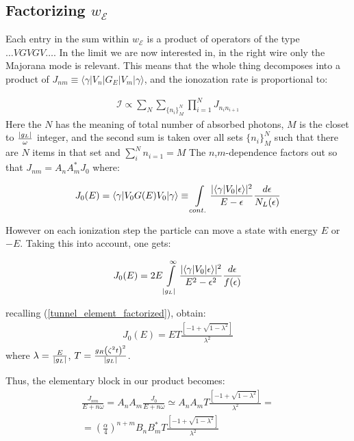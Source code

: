 \subsection{Factorizing $ w_\mathcal{E} $}
Each entry in the sum within $ w_{\mathcal{E}} $ is a product of operators of the type $ \dots VGVGV\dots. $ In the limit we are now interested in, in the right wire only the Majorana mode is relevant. This means that the whole thing decomposes into a product of $ J_{nm}\equiv\langle\gamma|V_{n}|G_{E}|V_{m}|\gamma\rangle $, and the ionozation rate is proportional to:

\begin{gather}
	\mathcal{I}\propto
	\sum_N \sum_{\{n_i\}_M^N}\prod_{i=1}^{N}J_{n_in_{i+1}}
\end{gather}
Here the $ N $ has the meaning of total number of absorbed photons, $ M $ is the closet to $ \frac{\left|g_L\right|}{\omega }$ integer, and the second sum is taken over all sets $ \{n_i\}_M^N $ such that there are $ N $ items in that set and $ \sum_i^N n_{i=1} = M$
 The $ n $,$ m $-dependence factors out so that $ J_{nm}=A_{n}A_{m}^{*}J_{0} $ where:

\begin{gather}
	J_{0}(E)=\langle\gamma|V_{0}G(E)V_{0}|\gamma\rangle\equiv\intop_{cont.}\frac{|\langle\gamma|V_{0}|\epsilon\rangle|^{2}}{E-\epsilon}\frac{d\epsilon}{N_L(\epsilon)}
\end{gather}

However on each ionization step  the particle can move a state with energy $ E $ or $ -E $. Taking this into account, one	 gets:

\begin{gather}
	J_{0}(E)
	=
	2E\intop_{|g_{L}|}^{\infty}\frac{|\langle\gamma|V_{0}|\epsilon\rangle|^{2}}{E^{2}-\epsilon^{2}}\frac{d\epsilon}{f(\epsilon)}
\end{gather}

recalling (\ref{tunnel_element_factorized}), obtain:
\begin{gather}
		J_{0}(E)
		=
		ET\frac{\left[-1+\sqrt{1-\lambda^{2}}\right]}{\lambda^{2}}
\end{gather}
where $ \lambda = \frac{E}{\left|g_L\right|} $, $ T=\frac{g_R\left(\zeta^2t\right)^2}{\left|g_L\right|} $.

Thus, the elementary block in our product becomes:
\begin{multline}
	\frac{J_{nm}}{E+n\omega}
	=
	A_{n}A_{m}\frac{J_{0}}{E+n\omega}\simeq A_{n}A_{m}T\frac{\left[-1+\sqrt{1-\lambda^{2}}\right]}{\lambda^{2}}
	=
	\\
	=\left(\frac{\alpha}{4}\right)^{n+m}B_{n}B_{m}^{*}T\frac{\left[-1+\sqrt{1-\lambda^{2}}\right]}{\lambda^{2}}
\end{multline}

